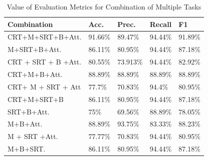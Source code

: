 \begin{table}[h]
\centering
\caption{Value of Evaluation Metrics for Combination of Multiple Tasks}
\label{table:multi table}

{
\begin{tabular}{lllll}
\hline
Combination           & Acc.   & Prec.   & Recall & F1     \\ \hline
CRT+M+SRT+B+Att.      & 91.66\% & 89.47\%  & 94.44\% & 91.89\% \\
M+SRT+B+Att.          & 86.11\% & 80.95\%  & 94.44\% & 87.18\% \\
CRT + SRT + B   +Att. & 80.55\% & 73.913\% & 94.44\% & 82.92\% \\
CRT+M+B+Att.          & 88.89\% & 88.89\%  & 88.89\% & 88.89\% \\
CRT+ M + SRT +   Att  & 77.7\%  & 70.83\%  & 94.4\%  & 80.95\% \\
CRT+M+SRT+B           & 86.11\% & 80.95\%  & 94.44\% & 87.18\% \\
SRT+B+Att.            & 75\%    & 69.56\%  & 88.89\% & 78.05\% \\
M+B+Att.              & 88.89\% & 93.75\%  & 83.33\% & 88.23\% \\
M + SRT +Att.         & 77.77\% & 70.83\%  & 94.44\% & 80.95\% \\
M+B+SRT.              & 86.11\% & 80.95\%  & 94.44\% & 87.18\% \\ \hline
\end{tabular}
}
\label{table:multi task}
\end{table}